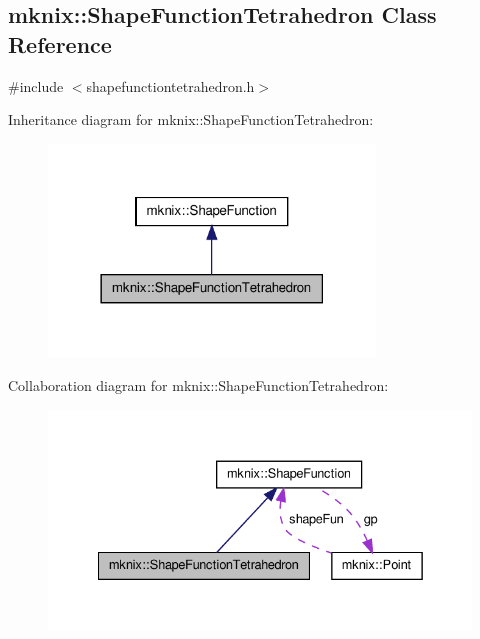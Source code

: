 \hypertarget{classmknix_1_1_shape_function_tetrahedron}{\subsection{mknix\-:\-:Shape\-Function\-Tetrahedron Class Reference}
\label{classmknix_1_1_shape_function_tetrahedron}
}


{\ttfamily \#include $<$shapefunctiontetrahedron.\-h$>$}



Inheritance diagram for mknix\-:\-:Shape\-Function\-Tetrahedron\-:\nopagebreak
\begin{figure}[H]
\begin{center}
\leavevmode
\includegraphics[width=246pt]{d3/db6/classmknix_1_1_shape_function_tetrahedron__inherit__graph}
\end{center}
\end{figure}


Collaboration diagram for mknix\-:\-:Shape\-Function\-Tetrahedron\-:\nopagebreak
\begin{figure}[H]
\begin{center}
\leavevmode
\includegraphics[width=334pt]{dc/dc9/classmknix_1_1_shape_function_tetrahedron__coll__graph}
\end{center}
\end{figure}

